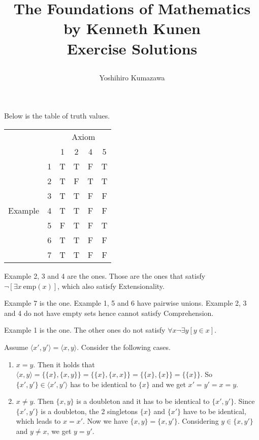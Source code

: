\documentclass[12pt]{article}
\theoremstyle{definition}
\newenvironment{customthm}[1]
  {\renewcommand\theinnercustomthm{#1}\innercustomthm}
  {\endinnercustomthm}
\begin{document}
\title{
  The Foundations of Mathematics \\
  \large by Kenneth Kunen \\
  Exercise Solutions
  \author{Yoshihiro Kumazawa}
}
\maketitle

\begin{customthm}{I.2.1} Below is the table of truth values.
  \begin{center}
    \begin{tabular}{cc|cccc}
      & & \multicolumn{4}{c}{Axiom} \\
      & & 1 & 2 & 4 & 5 \\ \hline
      \multirow{7}{*}{Example}
      & 1 & T & T & F & T \\
      & 2 & T & F & T & T \\
      & 3 & T & T & F & F \\
      & 4 & T & T & F & F \\
      & 5 & F & T & F & T \\
      & 6 & T & T & F & F \\
      & 7 & T & T & F & F \\
    \end{tabular}
  \end{center}
\end{customthm}

\begin{customthm}{I.6.3} Example 2, 3 and 4 are the ones. Those are the ones that satisfy $\neg[\exists x~\mathrm{emp}(x)]$, which also satisfy Extensionality.
\end{customthm}

\begin{customthm}{I.6.11} Example 7 is the one. Example 1, 5 and 6 have pairwise unions. Example 2, 3 and 4 do not have empty sets hence cannot satisfy Comprehension.
\end{customthm}

\begin{customthm}{I.6.13} Example 1 is the one. The other ones do not satisfy $\forall x\neg\exists y[y\in x]$.
\end{customthm}

\begin{customthm}{I.6.15} Assume $\langle x',y'\rangle = \langle x,y\rangle$. Consider the following cases.
  \begin{enumerate}
  \item \underline{$x=y$}. Then it holds that $\langle x,y\rangle = \{\{x\}, \{x,y\}\} = \{\{x\}, \{x,x\}\} = \{\{x\}, \{x\}\} = \{\{x\}\}$. So $\{x',y'\}\in\langle x',y'\rangle$ has to be  identical to $\{x\}$ and we get $x'=y'=x=y$.
  \item \underline{$x\neq y$}. Then $\{x,y\}$ is a doubleton and it has to be identical to $\{x',y'\}$. Since $\{x',y'\}$ is a doubleton, the 2 singletons $\{x\}$ and $\{x'\}$ have to be identical, which leads to $x=x'$. Now we have $\{x,y\} = \{x,y'\}$. Considering $y\in \{x,y'\}$ and $y\neq x$, we get $y=y'$.
  \end{enumerate}
\end{customthm}
\end{document}
